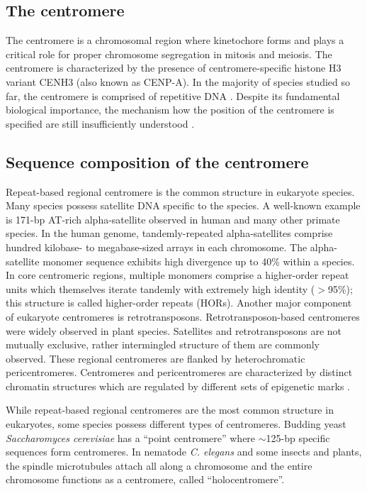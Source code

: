 \subsection*{The centromere}
  The centromere is a chromosomal region where kinetochore forms and plays a critical role for proper chromosome segregation in mitosis and meiosis. The centromere is characterized by the presence of centromere-specific histone H3 variant CENH3 (also known as CENP-A). In the majority of species studied so far, the centromere is comprised of repetitive DNA \cite{Plohl2014}. Despite its fundamental biological importance, the mechanism how the position of the centromere is specified are still insufficiently understood \cite{McKinley2016}.


\subsection*{Sequence composition of the centromere}
  Repeat-based regional centromere is the common structure in eukaryote species. Many species possess satellite DNA specific to the species. A well-known example is 171-bp AT-rich alpha-satellite observed in human and many other primate species. In the human genome, tandemly-repeated alpha-satellites comprise hundred kilobase- to megabase-sized arrays in each chromosome. The alpha-satellite monomer sequence exhibits high divergence up to 40\% within a species. In core centromeric regions, multiple monomers comprise a higher-order repeat units which themselves iterate tandemly with extremely high identity ($>$95\%); this structure is called higher-order repeats (HORs). Another major component of eukaryote centromeres is retrotransposons. Retrotransposon-based centromeres were widely observed in plant species. Satellites and retrotransposons are not mutually exclusive, rather intermingled structure of them are commonly observed. These regional centromeres are flanked by heterochromatic pericentromeres. Centromeres and pericentromeres are characterized by distinct chromatin structures which are regulated by different sets of epigenetic marks \cite{}.

  While repeat-based regional centromeres are the most common structure in eukaryotes, some species possess different types of centromeres. Budding yeast \textit{Saccharomyces cerevisiae} has a ``point centromere'' where $\sim$125-bp specific sequences form centromeres. In nematode \textit{C. elegans} and some insects and plants, the spindle microtubules attach all along a chromosome and the entire chromosome functions as a centromere, called ``holocentromere''.


